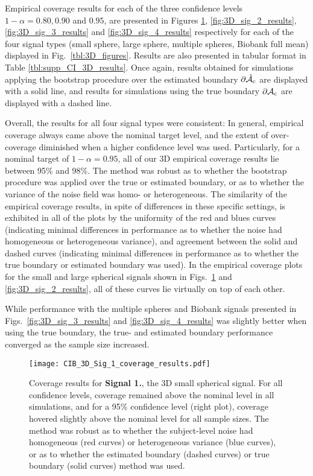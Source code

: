 Empirical coverage results for each of the three confidence levels $1 - \alpha = 0.80, 0.90$ and $0.95$, are presented in Figures \ref{fig:3D_sig_1_results}, \ref{fig:3D_sig_2_results}, \ref{fig:3D_sig_3_results} and \ref{fig:3D_sig_4_results} respectively for each of the four signal types (small sphere, large sphere, multiple spheres, Biobank full mean) displayed in Fig.\ \ref{tbl:3D_figures}. Results are also presented in tabular format in Table \ref{tbl:supp_CI_3D_results}. Once again, results obtained for simulations applying the bootstrap procedure over the estimated boundary $\operatorname{\partial\hat{\mathcal{A}}_{c}}$ are displayed with a solid line, and results for simulations using the true boundary $\operatorname{\partial\mathcal{A}_{c}}$ are displayed with a dashed line.

Overall, the results for all four signal types were consistent: In general, empirical coverage always came above the nominal target level, and the extent of over-coverage diminished when a higher confidence level was used. Particularly, for a nominal target of $1 - \alpha = 0.95$, all of our 3D empirical coverage results lie between 95\% and 98\%. The method was robust as to whether the bootstrap procedure was applied over the true or estimated boundary, or as to whether the variance of the noise field was homo- or heterogeneous. The similarity of the empirical coverage results, in spite of differences in these specific settings, is exhibited in all of the plots by the uniformity of the red and blues curves (indicating minimal differences in performance as to whether the noise had homogeneous or heterogeneous variance), and agreement between the solid and dashed curves (indicating minimal differences in performance as to whether the true boundary or estimated boundary was used). In the empirical coverage plots for the small and large spherical signals shown in Figs.\ \ref{fig:3D_sig_1_results} and \ref{fig:3D_sig_2_results}, all of these curves lie virtually on top of each other. 

While performance with the multiple spheres and Biobank signals presented in Figs.\ \ref{fig:3D_sig_3_results} and \ref{fig:3D_sig_4_results} was slightly better when using the true boundary, the true- and estimated boundary performance converged as the sample size increased.

\begin{figure}[htbp]
\hspace*{-1.5cm}
    \texttt{[image: CIB\_3D\_Sig\_1\_coverage\_results.pdf]}
\caption{Coverage results for \textbf{Signal 1.}, the 3D small spherical signal. For all confidence levels, coverage remained above the nominal level in all simulations, and for a 95\% confidence level (right plot), coverage hovered slightly above the nominal level for all sample sizes. The method was robust as to whether the subject-level noise had homogeneous (red curves) or heterogeneous variance (blue curves), or as to whether the estimated boundary (dashed curves) or true boundary (solid curves) method was used.}
\label{fig:3D_sig_1_results}
\end{figure}


